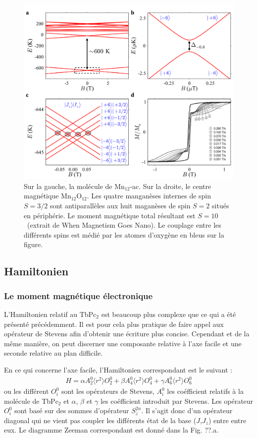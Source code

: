 \begin{figure}
\centering \includegraphics[scale=0.5]{Theorie/MagMol/figure4/figure4.pdf} 
\caption{Sur la gauche, la molécule de Mn$_{12}$-ac. Sur la droite, le centre magnétique Mn$_{12}$O$_{12}$. Les quatre manganèses internes de spin $S=3/2$ sont antiparallèles aux huit maganèses de spin $S=2$ situés en périphérie. Le moment magnétique total résultant est $S=10$~(extrait de When Magnetism Goes Nano). Le couplage entre les différents spins est médié par les atomes d'oxygène en bleus sur la figure.}
\label{TbPc2Zeeman}
\end{figure}

\subsection{Hamiltonien}

\subsubsection{Le moment magnétique électronique}
L'Hamiltonien relatif au TbPc$_2$ est beaucoup plus complexe que ce qui a été présenté précédemment. Il est pour cela plus pratique de faire appel aux opérateur de Stevens afin d'obtenir une écriture plus concise. Cependant et de la même manière, on peut discerner une composante relative à l'axe facile et une seconde relative au plan difficile. 

En ce qui concerne l'axe facile, l'Hamiltonien correspondant est le suivant :
\begin{eqnarray}
H = \alpha A_2^0 \langle r^2 \rangle O_2^0 + \beta A_4^0 \langle r^2 \rangle O_4^0 + \gamma A_6^0 \langle r^2 \rangle O_6^0
\end{eqnarray}
ou les différent $O_i^0$ sont les opérateurs de Stevens, $A_i^0$ les coéfficient relatifs à la molécule de TbPc$_2$ et $\alpha$, $\beta$ et $\gamma$ les coéfficient introduit par Stevens. Les opérateur $O^0_i$ sont basé sur des sommes d'opérateur $S_z^{2n}$. Il s'agit donc d'un opérateur diagonal qui ne vient pas coupler les différents état de la base ($J$,$J_z$) entre entre eux. Le diagramme Zeeman correspondant est donné dans la Fig. ??.a.

